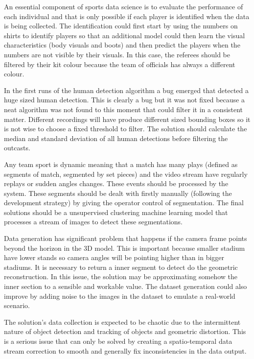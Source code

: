 \documentclass[
    11pt,
    oneside
]{report}
\begin{document}
An essential component of sports data science is to evaluate the performance of each individual and that is only possible if each player is identified when the data is being collected. The identification could first start by using the numbers on shirts to identify players so that an additional model could then learn the visual characteristics (body visuals and boots) and then predict the players when the numbers are not visible by their visuals. In this case, the referees should be filtered by their kit colour because the team of officials has always a different colour.


In the first runs of the human detection algorithm a bug emerged that detected a huge sized human detection. This is clearly a bug but it was not fixed because a neat algorithm was not found to this moment that could filter it in a consistent matter. Different recordings will have produce different sized bounding boxes so it is not wise to choose a fixed threshold to filter. The solution should calculate the median and standard deviation of all human detections before filtering the outcasts.


Any team sport is dynamic meaning that a match has many plays (defined as segments of match, segmented by set pieces) and the video stream have regularly replays or sudden angles changes. These events should be processed by the system. These segments should be dealt with firstly manually (following the development strategy) by giving the operator control of segmentation. The final solutions should be a unsupervised clustering machine learning model that processes a stream of images to detect these segmentations.


Data generation has significant problem that happens if the camera frame points beyond the horizon in the 3D model. This is important because smaller stadium have lower stands so camera angles will be pointing higher than in bigger stadiums. It is necessary to return a inner segment to detect do the geometric reconstruction. In this issue, the solution may be approximating somehow the inner section to a sensible and workable value. The dataset generation could also improve by adding noise to the images in the dataset to emulate a real-world scenario.


The solution's data collection is expected to be chaotic due to the intermittent nature of object detection and tracking of objects and geometric distortion. This is a serious issue that can only be solved by creating a spatio-temporal data stream correction to smooth and generally fix inconsistencies in the data output.
\end{document}
